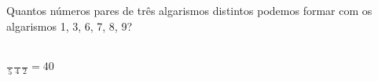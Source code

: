 \begin{ex}
 Quantos números pares de três algarismos distintos podemos formar com os algarismos 1, 3, 6, 7, 8, 9?
    \begin{sol}
        \phantom{A} \\
      $\frac{\phantom{A}}{5}\frac{\phantom{A}}{4}\frac{\phantom{A}}{2}=40$
    \end{sol}
\end{ex}